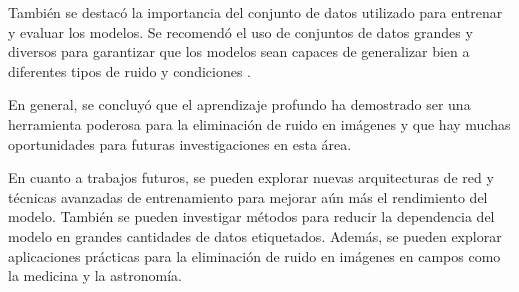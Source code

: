 \documentclass[a4paper,
               ]{jacow}
\begin{document}
También se destacó la importancia del conjunto de datos utilizado para entrenar y evaluar los modelos. Se recomendó el uso de conjuntos de datos grandes y diversos para garantizar que los modelos sean capaces de generalizar bien a diferentes tipos de ruido y condiciones \cite{zhang2018learning}.

En general, se concluyó que el aprendizaje profundo ha demostrado ser una herramienta poderosa para la eliminación de ruido en imágenes y que hay muchas oportunidades para futuras investigaciones en esta área.

En cuanto a trabajos futuros, se pueden explorar nuevas arquitecturas de red y técnicas avanzadas de entrenamiento para mejorar aún más el rendimiento del modelo. También se pueden investigar métodos para reducir la dependencia del modelo en grandes cantidades de datos etiquetados. Además, se pueden explorar aplicaciones prácticas para la eliminación de ruido en imágenes en campos como la medicina y la astronomía.
%
%
%
	{\printbibliography}%
\end{document}
